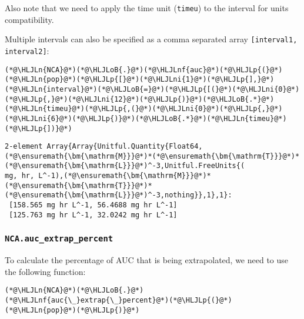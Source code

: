\documentclass[12pt,a4paper]{article}
\newcommand{\HLJLn}[1]{#1}
\newcommand{\HLJLnf}[1]{\textcolor[RGB]{66,102,213}{#1}}
\newcommand{\HLJLni}[1]{\textcolor[RGB]{59,151,46}{#1}}
\newcommand{\HLJLoB}[1]{\textcolor[RGB]{102,102,102}{\textbf{#1}}}
\newcommand{\HLJLp}[1]{#1}
\begin{document}
Also note that we need to apply the time unit (\texttt{timeu}) to the interval for units compatibility.

Multiple intervals can also be specified as a comma separated array \texttt{[interval1, interval2]}:


\begin{lstlisting}
(*@\HLJLn{NCA}@*)(*@\HLJLoB{.}@*)(*@\HLJLnf{auc}@*)(*@\HLJLp{(}@*)(*@\HLJLn{pop}@*)(*@\HLJLp{[}@*)(*@\HLJLni{1}@*)(*@\HLJLp{],}@*) (*@\HLJLn{interval}@*)(*@\HLJLoB{=}@*)(*@\HLJLp{[(}@*)(*@\HLJLni{0}@*)(*@\HLJLp{,}@*)(*@\HLJLni{12}@*)(*@\HLJLp{)}@*)(*@\HLJLoB{.*}@*)(*@\HLJLn{timeu}@*)(*@\HLJLp{,(}@*)(*@\HLJLni{0}@*)(*@\HLJLp{,}@*)(*@\HLJLni{6}@*)(*@\HLJLp{)}@*)(*@\HLJLoB{.*}@*)(*@\HLJLn{timeu}@*)(*@\HLJLp{])}@*)
\end{lstlisting}

\begin{lstlisting}
2-element Array{Array{Unitful.Quantity{Float64,(*@\ensuremath{\bm{\mathrm{M}}}@*)*(*@\ensuremath{\bm{\mathrm{T}}}@*)*(*@\ensuremath{\bm{\mathrm{L}}}@*)^-3,Unitful.FreeUnits{(
mg, hr, L^-1),(*@\ensuremath{\bm{\mathrm{M}}}@*)*(*@\ensuremath{\bm{\mathrm{T}}}@*)*(*@\ensuremath{\bm{\mathrm{L}}}@*)^-3,nothing}},1},1}:
 [158.565 mg hr L^-1, 56.4688 mg hr L^-1]
 [125.763 mg hr L^-1, 32.0242 mg hr L^-1]
\end{lstlisting}


\subsubsection{\texttt{NCA.auc\_extrap\_percent}}
To calculate the percentage of AUC that is being extrapolated, we need to use the following function:


\begin{lstlisting}
(*@\HLJLn{NCA}@*)(*@\HLJLoB{.}@*)(*@\HLJLnf{auc{\_}extrap{\_}percent}@*)(*@\HLJLp{(}@*)(*@\HLJLn{pop}@*)(*@\HLJLp{)}@*)
\end{lstlisting}
\end{document}
